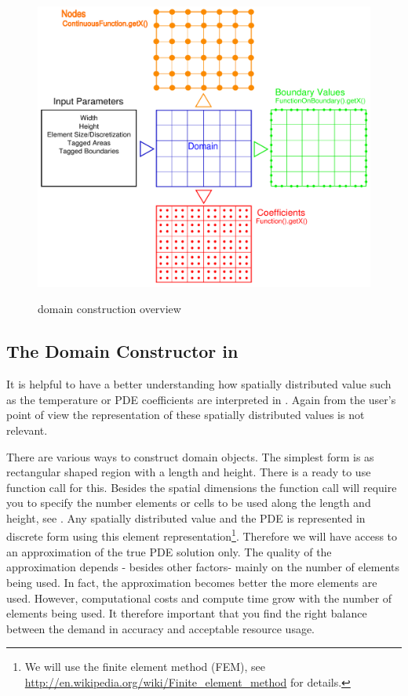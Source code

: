 \begin{figure}[t]
 \centering
   \includegraphics[width=6in]{figures/functionspace.pdf}
   \label{fig:fs}
   \caption{\esc domain construction overview}
\end{figure}

\subsection{The Domain Constructor in \esc}
\label{ss:domcon}
It is helpful to have a better understanding how spatially distributed value such as the temperature or PDE coefficients are interpreted in \esc. Again
from the user's point of view the representation of these spatially distributed values is not relevant. 

There are various ways to construct domain objects. The simplest form is as rectangular shaped region with a length and height. There is
a ready to use function call for this. Besides the spatial dimensions the function call will require you to specify the number
elements or cells to be used along the length and height, see . Any spatially distributed value 
and the PDE is represented in discrete form using this element representation\footnote{We will use the finite element method (FEM), see \url{http://en.wikipedia.org/wiki/Finite_element_method} for details.}. Therefore we will have access to an approximation of the true PDE solution only. 
The quality of the approximation depends - besides other factors- mainly on the number of elements being used. In fact, the 
approximation becomes better the more elements are used. However, computational costs and compute time grow with the number of
elements being used. It therefore important that you find the right balance between the demand in accuracy and acceptable resource usage.

